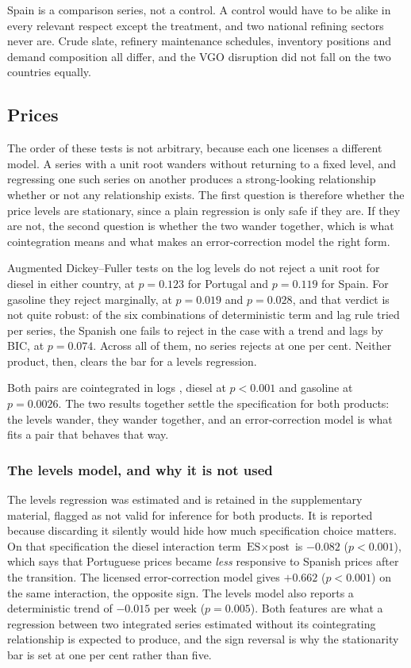 \documentclass[11pt,a4paper]{article}
\begin{document}
Spain is a comparison series, not a control. A control would have to be alike in every relevant
respect except the treatment, and two national refining sectors never are. Crude slate, refinery
maintenance schedules, inventory positions and demand composition all differ, and the VGO
disruption did not fall on the two countries equally.

\subsection{Prices}

The order of these tests is not arbitrary, because each one licenses a different model. A
series with a unit root wanders without returning to a fixed level, and regressing one such
series on another produces a strong-looking relationship whether or not any relationship
exists. The first question is therefore whether the price levels are stationary, since a plain
regression is only safe if they are. If they are not, the second question is whether the two
wander together, which is what cointegration means and what makes an error-correction model
the right form.

Augmented Dickey--Fuller tests \citep{dickey1979distribution, said1984testing} on the log
levels do not reject a unit root for diesel in either
country, at $p=0.123$ for Portugal and $p=0.119$ for Spain. For gasoline they reject
marginally, at $p=0.019$ and $p=0.028$, and that verdict is not quite robust: of the six
combinations of deterministic term and lag rule tried per series, the Spanish one fails to reject
in the case with a trend and lags by BIC, at $p=0.074$. Across all of them, no series rejects at
one per cent. Neither product, then, clears the bar for a levels regression.

Both pairs are cointegrated in logs \citep{engle1987cointegration}, diesel at $p<0.001$ and
gasoline at $p=0.0026$. The two
results together settle the specification for both products: the levels wander, they wander
together, and an error-correction model is what fits a pair that behaves that way.

\subsubsection*{The levels model, and why it is not used}
\label{sec:levels}

The levels regression was estimated and is retained in the supplementary material, flagged as
not valid for inference for both products. It is reported because discarding it silently would
hide how much specification choice matters. On that specification the diesel interaction term
$\text{ES}\times\text{post}$ is $-0.082$ ($p<0.001$), which says that Portuguese prices became
\emph{less} responsive to Spanish prices after the transition. The licensed error-correction
model gives $+0.662$ ($p<0.001$) on the same interaction, the opposite sign. The levels model
also reports a deterministic trend of $-0.015$ per week ($p=0.005$). Both features are what a
regression between two integrated series estimated without its cointegrating relationship is
expected to produce, and the sign reversal is why the stationarity bar is set at one per cent
rather than five.
\end{document}
